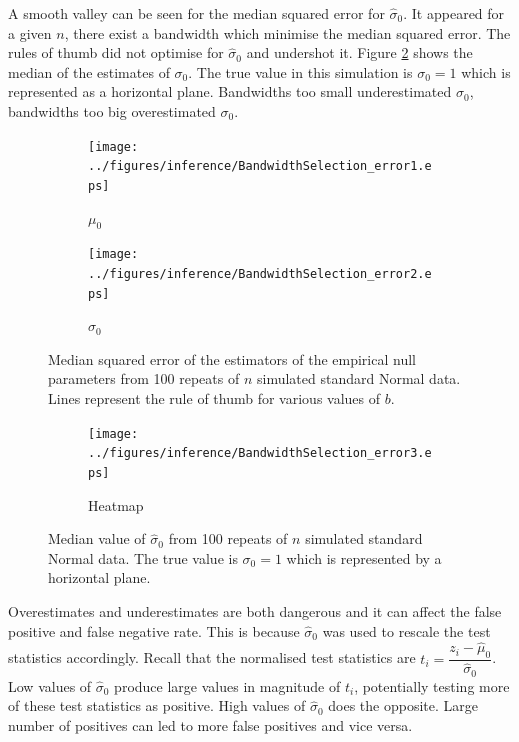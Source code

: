 A smooth valley can be seen for the median squared error for $\widehat{\sigma}_0$. It appeared for a given $n$, there exist a bandwidth which minimise the median squared error. The rules of thumb did not optimise for $\widehat{\sigma}_0$ and undershot it. Figure \ref{fig:inference_BandwidthSelection_error3} shows the median of the estimates of $\sigma_0$. The true value in this simulation is $\sigma_0=1$ which is represented as a horizontal plane. Bandwidths too small underestimated $\sigma_0$, bandwidths too big overestimated $\sigma_0$.

\begin{figure}
  \centering
  \begin{subfigure}[b]{\subSize}
      \texttt{[image: ../figures/inference/BandwidthSelection\_error1.eps]}
      \caption{$\mu_0$}
  \end{subfigure}
  \begin{subfigure}[b]{\subSize}
      \texttt{[image: ../figures/inference/BandwidthSelection\_error2.eps]}
      \caption{$\sigma_0$}
  \end{subfigure}
  \caption{Median squared error of the estimators of the empirical null parameters from 100 repeats of $n$ simulated standard Normal data. Lines represent the rule of thumb for various values of $b$.}
  \label{fig:inference_BandwidthSelection_error}
\end{figure}

\begin{figure}
  \centering
    \begin{subfigure}[b]{\subSize}
        \texttt{[image: ../figures/inference/BandwidthSelection\_error3.eps]}
        \caption{Heatmap}
    \end{subfigure}
    \caption{Median value of $\widehat{\sigma}_0$ from 100 repeats of $n$ simulated standard Normal data. The true value is $\sigma_0=1$ which is represented by a horizontal plane.}
    \label{fig:inference_BandwidthSelection_error3}
\end{figure}

Overestimates and underestimates are both dangerous and it can affect the false positive and false negative rate. This is because $\widehat{\sigma}_0$ was used to rescale the test statistics accordingly. Recall that the normalised test statistics are $t_i = \dfrac{z_i - \widehat{\mu}_0}{\widehat{\sigma}_0}$. Low values of $\widehat{\sigma}_0$ produce large values in magnitude of $t_i$, potentially testing more of these test statistics as positive. High values of $\widehat{\sigma}_0$ does the opposite. Large number of positives can led to more false positives and vice versa.

